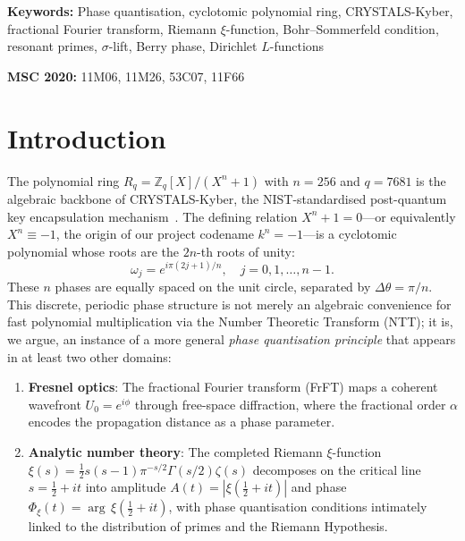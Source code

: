 \documentclass[11pt, a4paper]{article}
\theoremstyle{definition}
\theoremstyle{plain}
\newcommand{\Rq}{\mathbb{Z}_q[X]/(X^n+1)}
\newcommand{\xif}{\xi}                      %
\newcommand{\Phiz}{\Phi_\xi}               %
\newcommand{\Ampl}{A}                       %
\begin{document}
\vspace{0.5em}
\noindent\textbf{Keywords:} Phase quantisation, cyclotomic polynomial ring,
CRYSTALS-Kyber, fractional Fourier transform, Riemann $\xif$-function,
Bohr--Sommerfeld condition, resonant primes, $\sigma$-lift, Berry phase,
Dirichlet $L$-functions

\smallskip
\noindent\textbf{MSC 2020:} 11M06, 11M26, 53C07, 11F66

\tableofcontents
\newpage


\section{Introduction}
\label{sec:intro}

The polynomial ring $R_q = \Rq$ with $n = 256$ and $q = 7681$ is the
algebraic backbone of CRYSTALS-Kyber, the NIST-standardised post-quantum
key encapsulation mechanism~\cite{kyber2021}. The defining relation
$X^n + 1 = 0$---or equivalently $X^n \equiv -1$, the origin of our
project codename $k^n = -1$---is a cyclotomic polynomial whose roots are
the $2n$-th roots of unity:
\begin{equation}
  \omega_j = e^{i\pi(2j+1)/n}, \quad j = 0, 1, \ldots, n-1.
  \label{eq:cyclo_roots}
\end{equation}
These $n$ phases are equally spaced on the unit circle, separated by
$\Delta\theta = \pi/n$. This discrete, periodic phase structure is not
merely an algebraic convenience for fast polynomial multiplication via the
Number Theoretic Transform (NTT); it is, we argue, an instance of a more
general \textit{phase quantisation principle} that appears in at least two
other domains:

\begin{enumerate}
  \item \textbf{Fresnel optics}: The fractional Fourier transform (FrFT)
        maps a coherent wavefront $U_0 = e^{i\phi}$ through free-space
        diffraction, where the fractional order $\alpha$ encodes the
        propagation distance as a phase parameter.
  \item \textbf{Analytic number theory}: The completed Riemann
        $\xif$-function $\xif(s) = \tfrac{1}{2}s(s-1)\pi^{-s/2}\Gamma(s/2)\zeta(s)$
        decomposes on the critical line $s = \tfrac{1}{2} + it$ into
        amplitude $\Ampl(t) = |\xif(\tfrac{1}{2}+it)|$ and phase
        $\Phiz(t) = \arg\,\xif(\tfrac{1}{2}+it)$, with phase quantisation
        conditions intimately linked to the distribution of primes and the
        Riemann Hypothesis.
\end{enumerate}
\end{document}
